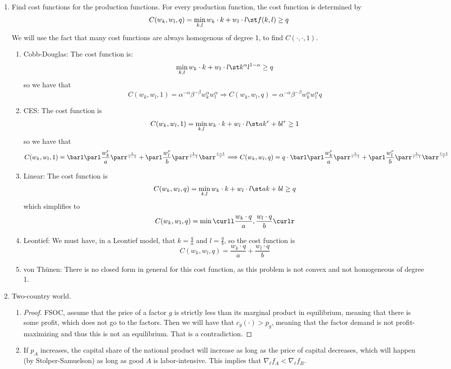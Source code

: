 \documentclass[10pt]{article}
\begin{document}
\maketitle


\begin{enumerate}
	\item Find cost functions for the production functions. For every production function, the cost function is determined by \[C(w_k,w_l,q) = \min_{k,l} w_k \cdot k + w_l \cdot l \st f(k,l) \ge q\]We will use the fact that many cost functions are always homogenous of degree 1, to find $C(\cdot,\cdot,1)$. \begin{enumerate} \item Cobb-Douglas: The cost function is: \[\min_{k,l} w_k \cdot k + w_l \cdot l \st k^\alpha l^{1-\alpha} \ge q \]so we have that \[C(w_k,w_l,1) = \alpha^{-\alpha} \beta^{-\beta} w_k^\alpha w_l^\alpha  \Longrightarrow C(w_k,w_l,q) = \alpha^{-\alpha} \beta^{-\beta} w_k^\alpha w_l^\alpha q\] \item CES: The cost function is \[C(w_k,w_l,1) = \min_{k,l} w_k \cdot k + w_l \cdot l \st ak^r + bl^r \ge 1\]so we have that \[C(w_k,w_l,1) = \barl \parl \frac{w_k^r}{a}\parr^{\frac{1}{r-1}} +  \parl \frac{w_l^r}{b}\parr^{\frac{1}{r-1}} \barr^{\frac{r-1}{r}} \Longrightarrow C(w_k,w_l,q) = q \cdot \barl \parl \frac{w_k^r}{a}\parr^{\frac{1}{r-1}} +  \parl \frac{w_l^r}{b}\parr^{\frac{1}{r-1}} \barr^{\frac{r-1}{r}}\] \item Linear: The cost function is \[C(w_k,w_l,q) = \min_{k,l} w_k \cdot k + w_l \cdot l \st ak + bl \ge q\]which simplifies to \[C(w_k,w_l,q) = \min\curll \frac{w_k \cdot q}{a}, \frac{w_l \cdot q}{b}\curlr\] \item Leontief: We must have, in a Leontief model, that $k = \frac{q}{a}$ and $l = \frac{q}{b}$, so the cost function is \[C(w_k,w_l,q) = \frac{w_k \cdot q}{a} + \frac{w_l \cdot q}{b}\] \item von Th\"{u}nen: There is no closed form in general for this cost function, as this problem is not convex and not homogeneous of degree 1.\end{enumerate}
	\item Two-country world. \begin{enumerate} \item \begin{proof} FSOC, assume that the price of a factor $g$ is strictly less than its marginal product in equilibrium, meaning that there is some profit, which does not go to the factors. Then we will have that $c_g(\cdot) > p_g$, meaning that the factor demand is not profit-maximizing and thus this is not an equilibrium. That is a contradiction. \end{proof} \item If $p_A$ increases, the capital share of the national product will increase as long as the price of capital decreases, which will happen (by Stolper-Samuelson) as long as good $A$ is labor-intensive. This implies that $\nabla_\ell f_A < \nabla_\ell f_B$.\end{enumerate}

\end{enumerate}
\end{document}
